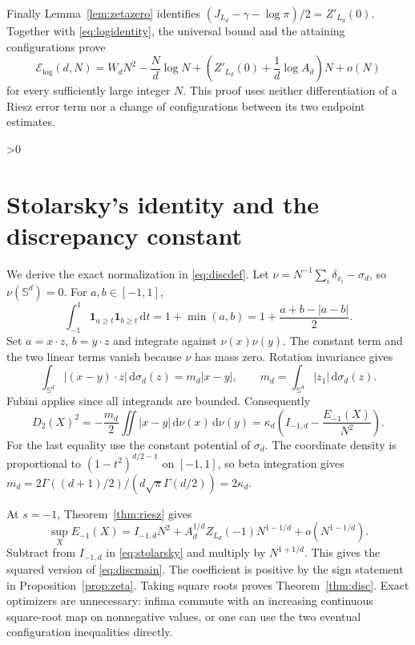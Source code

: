 \documentclass[11pt,a4paper]{article}
\theoremstyle{definition}
\newcommand{\Sph}{\mathbb S}
\newcommand{\cE}{\mathcal E}
\newcommand{\dd}{\,\mathrm d}
\newcommand{\abs}[1]{\lvert#1\rvert}
\newcommand{\one}{\mathbf1}
\numberwithin{equation}{section}
\let\originalsection\section
\renewcommand{\section}{\ifnum\value{section}>0\clearpage\fi\originalsection}
\begin{document}
Finally Lemma~\ref{lem:zetazero} identifies
$(J_{L_d}-\gamma-\log\pi)/2=Z'_{L_d}(0)$. Together with \eqref{eq:logidentity}, the universal bound and the attaining configurations prove
\[
 \cE_{\log}(d,N)=W_dN^2-\frac Nd\log N+
       \left(Z'_{L_d}(0)+\frac1d\log A_d\right)N+o(N)
\]
for every sufficiently large integer $N$. This proof uses neither differentiation of a Riesz error term nor a change of configurations between its two endpoint estimates.

\section{Stolarsky's identity and the discrepancy constant}\label{sec:stolarsky}
We derive the exact normalization in \eqref{eq:discdef}. Let $\nu=N^{-1}\sum_i\delta_{x_i}-\sigma_d$, so $\nu(\Sph^d)=0$. For $a,b\in[-1,1]$,
\begin{equation}
 \int_{-1}^1\one_{a\ge t}\one_{b\ge t}\dd t
 =1+\min(a,b)=1+\frac{a+b-\abs{a-b}}2.
\end{equation}
Set $a=x\cdot z$, $b=y\cdot z$ and integrate against $\nu(x)\nu(y)$. The constant term and the two linear terms vanish because $\nu$ has mass zero. Rotation invariance gives
\[
 \int_{\Sph^d}\abs{(x-y)\cdot z}\dd\sigma_d(z)
 =m_d\abs{x-y},\qquad m_d=\int_{\Sph^d}\abs{z_1}\dd\sigma_d(z).
\]
Fubini applies since all integrands are bounded. Consequently
\begin{equation}\label{eq:stolarsky}
 D_2(X)^2=-\frac{m_d}{2}\iint\abs{x-y}\dd\nu(x)\dd\nu(y)
 =\kappa_d\left(I_{-1,d}-\frac{E_{-1}(X)}{N^2}\right).
\end{equation}
For the last equality use the constant potential of $\sigma_d$. The coordinate density is proportional to $(1-t^2)^{d/2-1}$ on $[-1,1]$, so beta integration gives
$m_d=2\Gamma((d+1)/2)/(d\sqrt\pi\Gamma(d/2))=2\kappa_d$.

At $s=-1$, Theorem~\ref{thm:riesz} gives
\begin{equation}
 \sup_X E_{-1}(X)=I_{-1,d}N^2+
                  A_d^{1/d}Z_{L_d}(-1)N^{1-1/d}+o(N^{1-1/d}).
\end{equation}
Subtract from $I_{-1,d}$ in \eqref{eq:stolarsky} and multiply by $N^{1+1/d}$. This gives the squared version of \eqref{eq:discmain}. The coefficient is positive by the sign statement in Proposition~\ref{prop:zeta}. Taking square roots proves Theorem~\ref{thm:disc}. Exact optimizers are unnecessary: infima commute with an increasing continuous square-root map on nonnegative values, or one can use the two eventual configuration inequalities directly.
\end{document}
